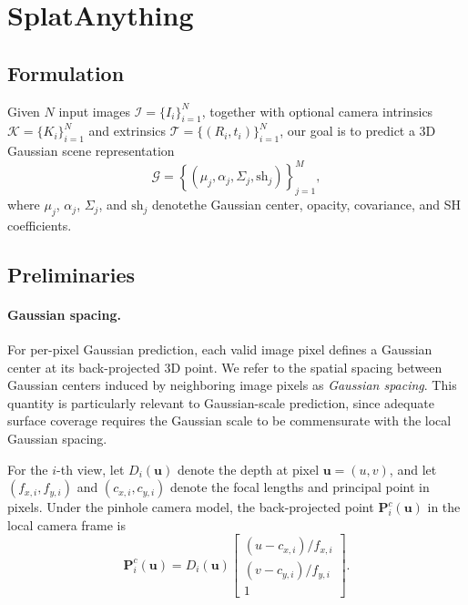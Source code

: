 \section{SplatAnything}
\label{sec:method}

\subsection{Formulation}

Given $N$ input images
$\mathcal{I}=\{I_i\}_{i=1}^{N}$,
together with optional camera intrinsics
$\mathcal{K}=\{K_i\}_{i=1}^{N}$
and extrinsics
$\mathcal{T}=\{(R_i,t_i)\}_{i=1}^{N}$,
our goal is to predict a 3D Gaussian scene representation
\begin{equation}
    \mathcal{G}
    =
    \left\{
        \left(\mu_j,\alpha_j,\Sigma_j,\mathrm{sh}_j\right)
    \right\}_{j=1}^{M},
\end{equation}
where $\mu_j$, $\alpha_j$, $\Sigma_j$, and $\mathrm{sh}_j$
denotethe Gaussian center, opacity, covariance, and SH coefficients.


\subsection{Preliminaries}

\paragraph{Gaussian spacing.}
For per-pixel Gaussian prediction, each valid image pixel defines a
Gaussian center at its back-projected 3D point. We refer to the spatial
spacing between Gaussian centers induced by neighboring image pixels as
\emph{Gaussian spacing}. This quantity is particularly relevant to
Gaussian-scale prediction, since adequate surface coverage requires the
Gaussian scale to be commensurate with the local Gaussian spacing.

For the $i$-th view, let $D_i(\mathbf{u})$ denote the depth at pixel
$\mathbf{u}=(u,v)$, and let $(f_{x,i},f_{y,i})$ and
$(c_{x,i},c_{y,i})$ denote the focal lengths and principal point in
pixels. Under the pinhole camera model, the back-projected point $\mathbf{P}_i^{c}(\mathbf{u})$ in the
local camera frame is
\begin{equation}
    \mathbf{P}_i^{c}(\mathbf{u})
    =
    D_i(\mathbf{u})
    \begin{bmatrix}
        (u-c_{x,i})/f_{x,i} \\
        (v-c_{y,i})/f_{y,i} \\
        1
    \end{bmatrix}.
    \label{eq:back_projection}
\end{equation}

